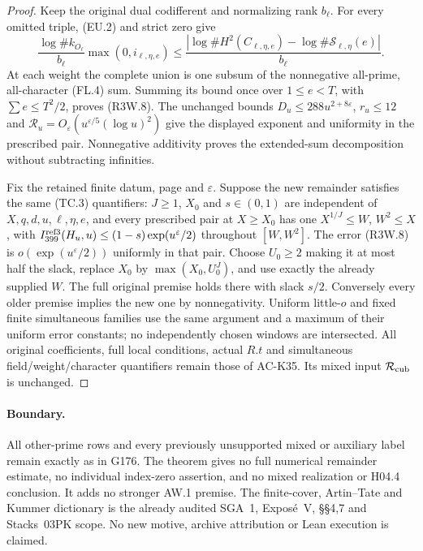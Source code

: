 \begin{proof}
Keep the original dual codifferent and normalizing rank $b_\ell$.
For every omitted triple, (EU.2) and strict zero give
\[
 \frac{\log\#k_{O_\ell}}{b_\ell}\max(0,i_{\ell,\eta,e})
 \leq\frac{|\log\#H^2(C_{\ell,\eta,e})
                    -\log\#\mathcal S_{\ell,\eta}(e)|}{b_\ell}.
 \tag{R3W.10}
\]
At each weight the complete union is one subsum of the
nonnegative all-prime, all-character (FL.4) sum.
Summing its bound once over $1\leq e<T$, with
$\sum e\leq T^2/2$, proves (R3W.8).
The unchanged bounds $D_u\leq288u^{2+8\varepsilon}$,
$r_u\leq12$ and
$\mathcal R_u=O_\varepsilon(u^{\varepsilon/5}(\log u)^2)$
give the displayed exponent and uniformity in the prescribed pair.
Nonnegative additivity proves the extended-sum decomposition
without subtracting infinities.

Fix the retained finite datum, page and $\varepsilon$.
Suppose the new remainder satisfies the same (TC.3) quantifiers:
$J\geq1$, $X_0$ and $s\in(0,1)$ are independent of
$X,q,d,u,\ell,\eta,e$, and every prescribed pair at $X\geq X_0$
has one $X^{1/J}\leq W$, $W^2\leq X$, with
$I_{399}^{\rm ref3}(H_u,u)\leq(1-s)\exp(u^\varepsilon/2)$
throughout $[W,W^2]$.
The error (R3W.8) is $o(\exp(u^\varepsilon/2))$ uniformly
in that pair.  Choose $U_0\geq2$ making it at most half the
slack, replace $X_0$ by $\max(X_0,U_0^J)$, and use exactly
the already supplied $W$.
The full original premise holds there with slack $s/2$.
Conversely every older premise implies the new one by nonnegativity.
Uniform little-$o$ and fixed finite simultaneous families use
the same argument and a maximum of their uniform error constants;
no independently chosen windows are intersected.
All original coefficients, full local conditions, actual $R.t$
and simultaneous field/weight/character quantifiers remain those
of AC-K35.  Its mixed input $\mathcal R_{\rm cub}$ is unchanged.
\end{proof}

\paragraph{Boundary.}
All other-prime rows and every previously unsupported mixed or
auxiliary label remain exactly as in G176.
The theorem gives no full numerical remainder estimate, no
individual index-zero assertion, and no mixed realization or H04.4
conclusion.  It adds no stronger AW.1 premise.
The finite-cover, Artin--Tate and Kummer dictionary is the already
audited SGA~1, Expos\'e~V, \S\S4,7 and Stacks~03PK scope.
No new motive, archive attribution or Lean execution is claimed.
